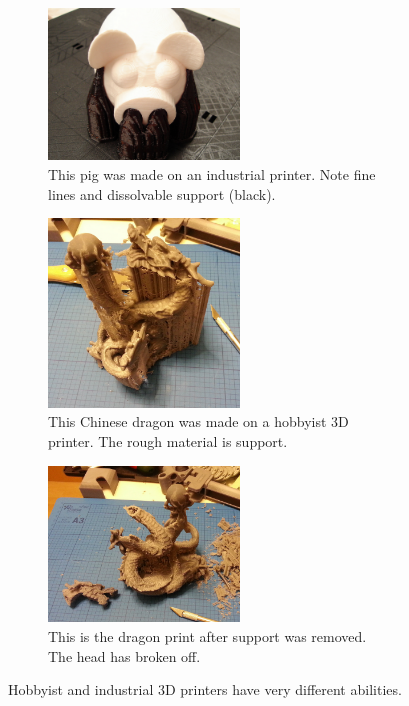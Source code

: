 \documentclass{sigchi}
\begin{document}



\begin{figure}
        \centering
        \begin{subfigure}[b]{0.3\textwidth}
                \includegraphics[width=2in]{images/uprint.png}
                \caption{This pig was made on an industrial printer.  Note fine lines and dissolvable support (black).}
                \label{fig:uprint}
        \end{subfigure}
        \begin{subfigure}[b]{0.3\textwidth}
                \includegraphics[width=2in]{images/printbefore.png}
                \caption{This Chinese dragon was made on a hobbyist 3D printer.  The rough material is support.}
                \label{fig:makerbot}
        \end{subfigure}
        \begin{subfigure}[b]{0.3\textwidth}
                \includegraphics[width=2in]{images/printafter.png}
                \caption{This is the dragon print after support was removed.  The head has broken off.}
                \label{fig:makerbotafter}
        \end{subfigure}
        \caption{Hobbyist and industrial 3D printers have very different abilities.}\label{fig:printers}
\end{figure}
\end{document}
